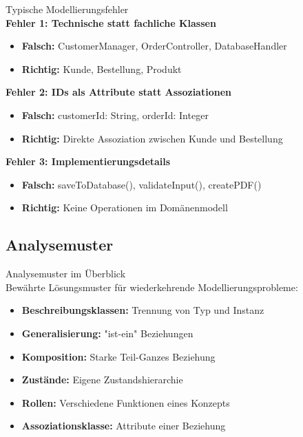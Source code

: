 \begin{example2}{Typische Modellierungsfehler}\\
\textbf{Fehler 1: Technische statt fachliche Klassen}
\begin{itemize}
    \item \textbf{Falsch:} CustomerManager, OrderController, DatabaseHandler
    \item \textbf{Richtig:} Kunde, Bestellung, Produkt
\end{itemize}

\textbf{Fehler 2: IDs als Attribute statt Assoziationen}
\begin{itemize}
    \item \textbf{Falsch:} customerId: String, orderId: Integer
    \item \textbf{Richtig:} Direkte Assoziation zwischen Kunde und Bestellung
\end{itemize}

\textbf{Fehler 3: Implementierungsdetails}
\begin{itemize}
    \item \textbf{Falsch:} saveToDatabase(), validateInput(), createPDF()
    \item \textbf{Richtig:} Keine Operationen im Domänenmodell
\end{itemize}
\end{example2}

\subsection{Analysemuster}

\begin{concept}{Analysemuster im Überblick}\\
Bewährte Lösungsmuster für wiederkehrende Modellierungsprobleme:

\begin{itemize}
    \item \textbf{Beschreibungsklassen:} Trennung von Typ und Instanz
    \item \textbf{Generalisierung:} "ist-ein" Beziehungen
    \item \textbf{Komposition:} Starke Teil-Ganzes Beziehung
    \item \textbf{Zustände:} Eigene Zustandshierarchie
    \item \textbf{Rollen:} Verschiedene Funktionen eines Konzepts
    \item \textbf{Assoziationsklasse:} Attribute einer Beziehung
\end{itemize}
\end{concept}

